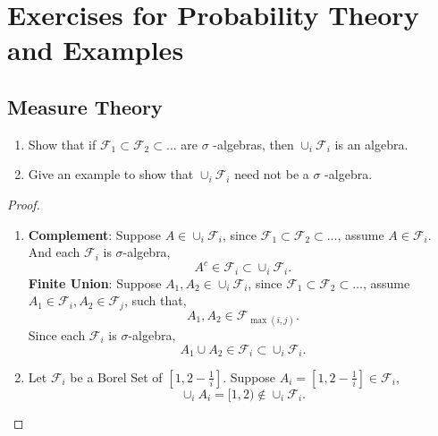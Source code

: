 \chapter{Exercises for Probability Theory and Examples}

\section{Measure Theory}

\begin{exercise}
	\begin{enumerate}
		\item Show that if $\mathcal{F}_{1}\subset \mathcal{F}_{2}\subset\ldots$ are $\sigma$ -algebras, then $\cup_{i}\mathcal{F}_{i}$ is an algebra.
		\item Give an example to show that $\cup_{i}\mathcal{F}_{i}$ need not be a $\sigma$ -algebra.
	\end{enumerate}
\end{exercise}

\begin{proof}
	\begin{enumerate}
		\item
		      \textbf{Complement}: Suppose $A\in\cup_{i}\mathcal{F}_{i}$, since $\mathcal{F}_{1}\subset \mathcal{F}_{2}\subset\ldots$, assume $A\in\mathcal{F}_{i}$. And each $\mathcal{F}_{i}$ is $\sigma$-algebra,
		      \begin{equation*}
			      A^c\in\mathcal{F}_{i}\subset\cup_{i}\mathcal{F}_{i}.
		      \end{equation*}
		      \textbf{Finite Union}: Suppose $A_1,A_2\in\cup_{i}\mathcal{F}_{i}$, since $\mathcal{F}_{1}\subset \mathcal{F}_{2}\subset\ldots$, assume $A_1\in\mathcal{F}_{i},A_2\in\mathcal{F}_{j}$, such that,
		      \begin{equation*}
			      A_1,A_2\in\mathcal{F}_{\max(i,j)}.
		      \end{equation*}
		      Since each $\mathcal{F}_{i}$ is $\sigma$-algebra,
		      \begin{equation*}
			      A_1\cup A_2\in\mathcal{F}_{i}\subset\cup_{i}\mathcal{F}_{i}.
		      \end{equation*}
		\item
		      Let $\mathcal{F}_{i}$ be a Borel Set of $[1,2-\frac{1}{i}]$. Suppose $A_i=[1,2-\frac{1}{i}]\in\mathcal{F}_{i}$,
		      \begin{equation*}
			      \cup_{i}A_{i}=[1,2)\notin\cup_{i}\mathcal{F}_{i}.
		      \end{equation*}
	\end{enumerate}
\end{proof}

